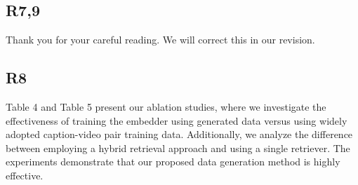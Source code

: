\documentclass[11pt]{article}
\begin{document}
\subsection{R7,9} Thank you for your careful reading. We will correct this in our revision.
\subsection{R8} Table 4 and Table 5 present our ablation studies, where we investigate the effectiveness of training the embedder using generated data versus using widely adopted caption-video pair training data. Additionally, we analyze the difference between employing a hybrid retrieval approach and using a single retriever. The experiments demonstrate that our proposed data generation method is highly effective. 
\end{document}
